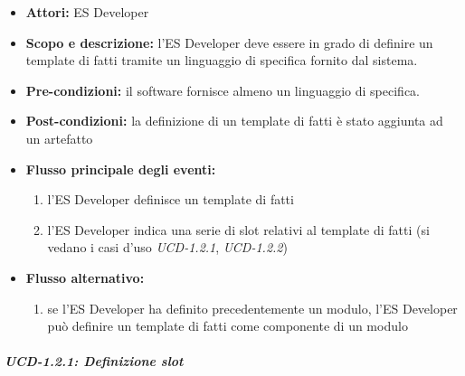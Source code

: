 \begin{itemize}
	\item \textbf{Attori:} ES Developer
	\item \textbf{Scopo e descrizione:} l'ES Developer deve essere in grado di definire un template di fatti tramite un linguaggio di specifica fornito dal sistema.
	\item \textbf{Pre-condizioni:} il software fornisce almeno un linguaggio di specifica.
	\item \textbf{Post-condizioni:} la definizione di un template di fatti è stato aggiunta ad un artefatto
	\item \textbf{Flusso principale degli eventi:}
		\begin{enumerate}
			\item l'ES Developer definisce un template di fatti
			\item l'ES Developer indica una serie di slot relativi al template di fatti (si vedano i casi d'uso \emph{UCD-1.2.1}, \emph{UCD-1.2.2})
		\end{enumerate}
	\item \textbf{Flusso alternativo:} 
		\begin{enumerate}
			\item se l'ES Developer ha definito precedentemente un modulo, l'ES Developer può definire un template di fatti come componente di un modulo
		\end{enumerate}
\end{itemize}

\subparagraph{UCD-1.2.1: Definizione slot}

